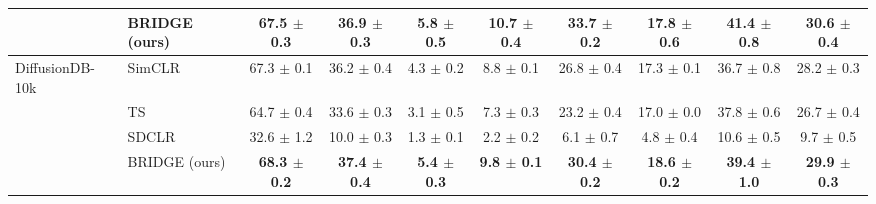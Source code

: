\begin{table}[t]
\begin{adjustbox}{max width=\textwidth}
\begin{tabular}{l l c c c c c c c c}
\rowcolor{blue!10} & BRIDGE (ours) & \textbf{67.5 {\scriptsize$\pm$ 0.3}} & 36.9 {\scriptsize$\pm$ 0.3} & \textbf{5.8 {\scriptsize$\pm$ 0.5}} & \textbf{10.7 {\scriptsize$\pm$ 0.4}} & \textbf{33.7 {\scriptsize$\pm$ 0.2}} & \textbf{17.8 {\scriptsize$\pm$ 0.6}} & \textbf{41.4 {\scriptsize$\pm$ 0.8}} & \textbf{30.6 {\scriptsize$\pm$ 0.4}} \\
\midrule
DiffusionDB-10k & SimCLR & 67.3 {\scriptsize$\pm$ 0.1} & 36.2 {\scriptsize$\pm$ 0.4} & 4.3 {\scriptsize$\pm$ 0.2} & 8.8 {\scriptsize$\pm$ 0.1} & 26.8 {\scriptsize$\pm$ 0.4} & 17.3 {\scriptsize$\pm$ 0.1} & 36.7 {\scriptsize$\pm$ 0.8} & 28.2 {\scriptsize$\pm$ 0.3} \\
 & TS & 64.7 {\scriptsize$\pm$ 0.4} & 33.6 {\scriptsize$\pm$ 0.3} & 3.1 {\scriptsize$\pm$ 0.5} & 7.3 {\scriptsize$\pm$ 0.3} & 23.2 {\scriptsize$\pm$ 0.4} & 17.0 {\scriptsize$\pm$ 0.0} & 37.8 {\scriptsize$\pm$ 0.6} & 26.7 {\scriptsize$\pm$ 0.4} \\
 & SDCLR & 32.6 {\scriptsize$\pm$ 1.2} & 10.0 {\scriptsize$\pm$ 0.3} & 1.3 {\scriptsize$\pm$ 0.1} & 2.2 {\scriptsize$\pm$ 0.2} & 6.1 {\scriptsize$\pm$ 0.7} & 4.8 {\scriptsize$\pm$ 0.4} & 10.6 {\scriptsize$\pm$ 0.5} & 9.7 {\scriptsize$\pm$ 0.5} \\
\rowcolor{blue!10} & BRIDGE (ours) & \textbf{68.3 {\scriptsize$\pm$ 0.2}} & \textbf{37.4 {\scriptsize$\pm$ 0.4}} & \textbf{5.4 {\scriptsize$\pm$ 0.3}} & \textbf{9.8 {\scriptsize$\pm$ 0.1}} & \textbf{30.4 {\scriptsize$\pm$ 0.2}} & \textbf{18.6 {\scriptsize$\pm$ 0.2}} & \textbf{39.4 {\scriptsize$\pm$ 1.0}} & \textbf{29.9 {\scriptsize$\pm$ 0.3}} \\
\bottomrule
\end{tabular}
\end{adjustbox}
\end{table}
